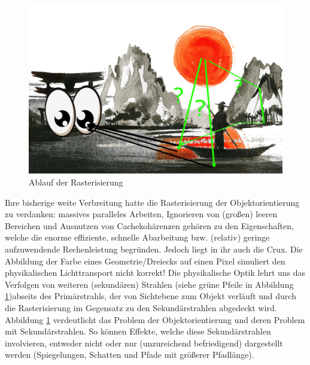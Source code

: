 \begin{figure}[H]
    \begin{tcolorbox}
    \centering
    \includegraphics[width=\linewidth]{content/PathTracer/Bilder/RasterizerGuide.png}
    \end{tcolorbox}
    \caption{Ablauf der Rasterisierung}
    \label{pic:RasterizerGuide}
\end{figure}

Ihre bisherige weite Verbreitung hatte die Rasterisierung der Objektorientierung zu verdanken: massives paralleles Arbeiten, Ignorieren von (großen) leeren Bereichen und
Ausnutzen von Cachekohärenzen gehören zu den Eigenschaften, welche die enorme effiziente, schnelle Abarbeitung bzw. (relativ) geringe aufzuwendende Rechenleistung begründen.
Jedoch liegt in ihr auch die Crux.
Die Abbildung der Farbe eines Geometrie/Dreiecks auf einen Pixel simuliert
den physikalischen Lichttransport nicht korrekt! Die physikalische Optik lehrt uns das Verfolgen von weiteren (sekundären) Strahlen 
(siehe grüne Pfeile in Abbildung \ref{pic:RasterizerGuide})abseits des Primärstrahls, der von 
Sichtebene zum Objekt verläuft und durch die Rasterisierung im Gegensatz zu den Sekundärstrahlen abgedeckt wird. Abbildung \ref{pic:RasterizerGuide} verdeutlicht das 
Problem der Objektorientierung und deren Problem mit Sekundärstrahlen. So können Effekte, welche diese Sekundärstrahlen involvieren, 
entweder nicht oder nur (unzureichend befriedigend) dargestellt werden (Spiegelungen, Schatten und Pfade mit größerer Pfadlänge). \par

